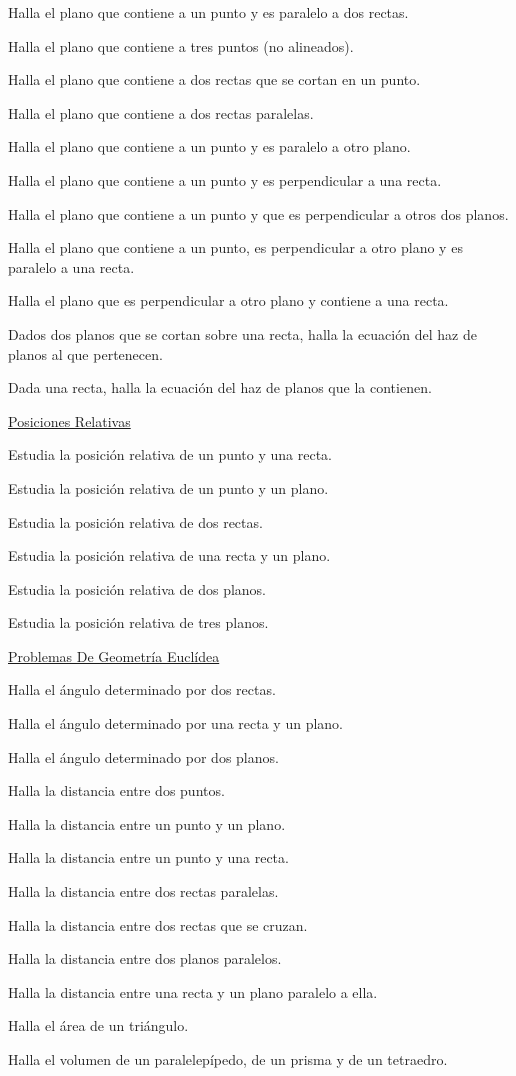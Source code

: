 \begin{enumerate}[Q1. ]
\begin{small}
Halla el plano que contiene a un punto y es paralelo a dos rectas.

Halla el plano que contiene a tres puntos (no alineados).
 
Halla el plano que contiene a dos rectas que se cortan en un punto.

Halla el plano que contiene a dos rectas paralelas.

Halla el plano que contiene a un punto y es paralelo a otro plano.

Halla el plano que contiene a un punto y es perpendicular a una recta.

Halla el plano que contiene a un punto y que es perpendicular a otros dos planos.

Halla el plano que contiene a un punto, es perpendicular a otro plano y es paralelo a una recta.

Halla el plano que es perpendicular a otro plano y contiene a una recta.
 
Dados dos planos que se cortan sobre una recta, halla la ecuación del haz de planos al que pertenecen. 

Dada una recta, halla la ecuación del haz de planos que la contienen.
 
\underline{Posiciones Relativas}

Estudia la posición relativa de un punto y una recta. 

Estudia la posición relativa de un punto y un plano. 

Estudia la posición relativa de dos rectas.

Estudia la posición relativa de una recta y un plano. 

Estudia la posición relativa de dos planos.
 
Estudia la posición relativa de tres planos.
 
\underline{Problemas De Geometría Euclídea}

Halla el ángulo determinado por dos rectas.

Halla el ángulo determinado por una recta y un plano. 

Halla el ángulo determinado por dos planos.
 
Halla la distancia entre dos puntos.

Halla la distancia entre un punto y un plano.

Halla la distancia entre un punto y una recta.

Halla la distancia entre dos rectas paralelas.

Halla la distancia entre dos rectas que se cruzan.

Halla la distancia entre dos planos paralelos.

Halla la distancia entre una recta y un plano paralelo a ella.
 
Halla el área de un triángulo. 

Halla el volumen de un paralelepípedo, de un prisma y de un tetraedro.
\end{small}

\end{enumerate}


